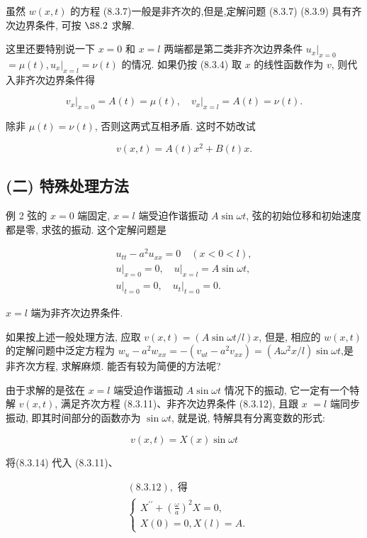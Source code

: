 虽然 $w(x, t)$ 的方程 (8.3.7)一般是非齐次的,但是,定解问题 (8.3.7) (8.3.9) 具有齐次边界条件, 可按 $\S 8.2$ 求解.

这里还要特别说一下 $x=0$ 和 $x=l$ 两端都是第二类非齐次边界条件 $\left.u_{x}\right|_{x=0}$ $=\mu(t),\left.u_{x}\right|_{x=l}=\nu(t)$ 的情况. 如果仍按 (8.3.4) 取 $x$ 的线性函数作为 $v$, 则代入非齐次边界条件得

$$
\left.v_{x}\right|_{x=0}=A(t)=\mu(t),\left.\quad v_{x}\right|_{x=l}=A(t)=\nu(t) .
$$

除非 $\mu(t)=\nu(t)$, 否则这两式互相矛盾. 这时不妨改试

$$
v(x, t)=A(t) x^{2}+B(t) x .
$$

\subsection{(二) 特殊处理方法}
例 2 弦的 $x=0$ 端固定, $x=l$ 端受迫作谐振动 $A \sin \omega t$, 弦的初始位移和初始速度都是零, 求弦的振动. 这个定解问题是

$$
\begin{gathered}
u_{t t}-a^{2} u_{x x}=0 \quad(x<0<l), \\
\left.u\right|_{x=0}=0,\left.\quad u\right|_{x=l}=A \sin \omega t, \\
\left.u\right|_{t=0}=0,\left.\quad u_{t}\right|_{t=0}=0 .
\end{gathered}
$$

$x=l$ 端为非齐次边界条件.

如果按上述一般处理方法, 应取 $v(x, t)=(A \sin \omega t / l) x$, 但是, 相应的 $w(x, t)$ 的定解问题中泛定方程为 $w_{u}-a^{2} w_{x x}=-\left(v_{u t}-a^{2} v_{x x}\right)=\left(A \omega^{2} x / l\right) \sin \omega t$,是非齐次方程, 求解麻烦. 能否有较为简便的方法呢?

由于求解的是弦在 $x=l$ 端受迫作谐振动 $A \sin \omega t$ 情况下的振动, 它一定有一个特解 $v(x, t)$, 满足齐次方程 (8.3.11)、非齐次边界条件 (8.3.12), 且跟 $x$
$=l$ 端同步振动, 即其时间部分的函数亦为 $\sin \omega t$, 就是说, 特解具有分离变数的形式:

$$
v(x, t)=X(x) \sin \omega t
$$

将(8.3.14) 代入 (8.3.11)、

$$
\begin{aligned}
& (8.3 .12), \text { 得 } \\
& \left\{\begin{array}{l}
X^{\prime \prime}+\left(\frac{\omega}{a}\right)^{2} X=0, \\
X(0)=0, X(l)=A .
\end{array}\right.
\end{aligned}
$$

